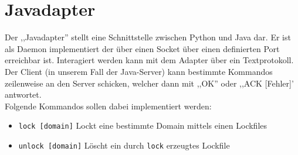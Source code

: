 \section{Javadapter} 
\label{sec:javadapter}
Der ,,Javadapter'' stellt eine Schnittstelle zwischen Python und Java dar. Er ist als Daemon implementiert der über einen Socket über einen definierten Port
erreichbar ist. Interagiert werden kann mit dem Adapter über ein Textprotokoll. Der Client (in unserem Fall der Java-Server) kann bestimmte Kommandos
zeilenweise an den Server schicken, welcher dann mit ,,OK'' oder ,,ACK [Fehler]' antwortet.
\\
Folgende Kommandos sollen dabei implementiert werden:
\begin{itemize}
    \item \texttt{lock [domain]}
        Lockt eine bestimmte Domain mittels einen Lockfiles
    \item \texttt{unlock [domain]}
        Löscht ein durch \texttt{lock} erzeugtes Lockfile
\end{itemize}
